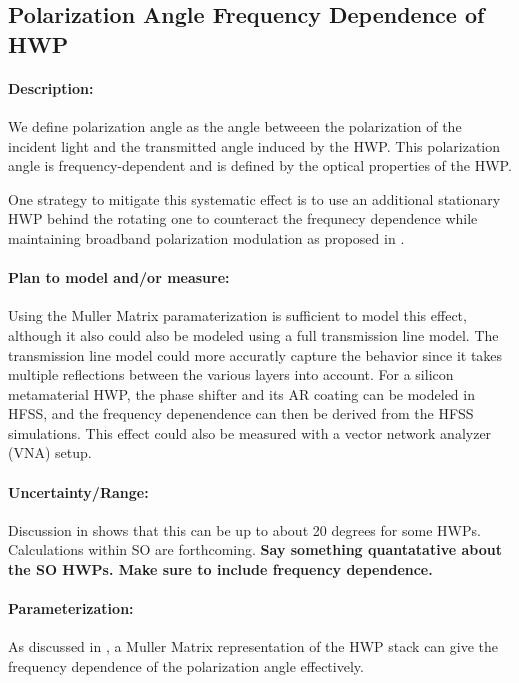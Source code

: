 \subsection{Polarization Angle Frequency Dependence of HWP}

\paragraph{Description:}

We define polarization angle as the angle betweeen the polarization of the incident light and the transmitted angle induced by the HWP. This polarization angle is frequency-dependent and is defined by the optical properties of the HWP.

One strategy to mitigate this systematic effect is to use an additional stationary HWP behind the rotating one to counteract the frequnecy dependence while maintaining broadband polarization modulation as proposed in \cite{Matsumura14}. 

\paragraph{Plan to model and/or measure:}
Using the Muller Matrix paramaterization is sufficient to model this effect, although it also could also be modeled using a full transmission line model. The transmission line model could more accuratly capture the behavior since it takes multiple reflections between the various layers into account. For a silicon metamaterial HWP, the phase shifter and its AR coating can be modeled in HFSS, and the frequency depenendence can then be derived from the HFSS simulations. This effect could also be measured with a vector network analyzer (VNA) setup.

\paragraph{Uncertainty/Range:}
Discussion in \cite{Matsumura09} shows that this can be up to about 20 degrees for some HWPs. Calculations within SO are forthcoming. \textbf{Say something quantatative about the SO HWPs. Make sure to include frequency dependence.}

\paragraph{Parameterization:}

As discussed in \cite{Matsumura09}, a Muller Matrix representation of the HWP stack can give the frequency dependence of the polarization angle effectively.


